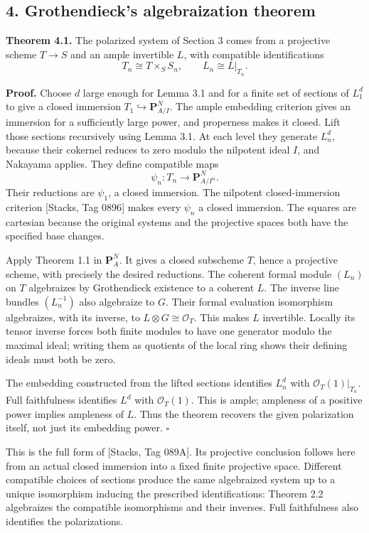 \documentclass[11pt]{article}
\begin{document}
\subsection{4. Grothendieck's algebraization
theorem}\label{grothendiecks-algebraization-theorem}

\textbf{Theorem 4.1.} The polarized system of Section 3 comes from a
projective scheme \(T\to S\) and an ample invertible \(L\), with
compatible identifications \[
T_n\cong T\times_S S_n,
\qquad L_n\cong L|_{T_n}.
\]

\textbf{Proof.} Choose \(d\) large enough for Lemma 3.1 and for a finite
set of sections of \(L_1^d\) to give a closed immersion
\(T_1\hookrightarrow\mathbf P^N_{A/I}\). The ample embedding criterion
gives an immersion for a sufficiently large power, and properness makes
it closed. Lift those sections recursively using Lemma 3.1. At each
level they generate \(L_n^d\), because their cokernel reduces to zero
modulo the nilpotent ideal \(I\), and Nakayama applies. They define
compatible maps \[
\psi_n:T_n\longrightarrow\mathbf P^N_{A/I^n}.
\] Their reductions are \(\psi_1\), a closed immersion. The nilpotent
closed-immersion criterion {[}Stacks, Tag 0896{]} makes every \(\psi_n\)
a closed immersion. The squares are cartesian because the original
systems and the projective spaces both have the specified base changes.

Apply Theorem 1.1 in \(\mathbf P^N_A\). It gives a closed subscheme
\(T\), hence a projective scheme, with precisely the desired reductions.
The coherent formal module \((L_n)\) on \(T\) algebraizes by
Grothendieck existence to a coherent \(L\). The inverse line bundles
\((L_n^{-1})\) also algebraize to \(G\). Their formal evaluation
isomorphism algebraizes, with its inverse, to
\(L\otimes G\cong\mathcal O_T\). This makes \(L\) invertible. Locally
its tensor inverse forces both finite modules to have one generator
modulo the maximal ideal; writing them as quotients of the local ring
shows their defining ideals must both be zero.

The embedding constructed from the lifted sections identifies \(L_n^d\)
with \(\mathcal O_T(1)|_{T_n}\). Full faithfulness identifies \(L^d\)
with \(\mathcal O_T(1)\). This is ample; ampleness of a positive power
implies ampleness of \(L\). Thus the theorem recovers the given
polarization itself, not just its embedding power. \(\square\)

This is the full form of {[}Stacks, Tag 089A{]}. Its projective
conclusion follows here from an actual closed immersion into a fixed
finite projective space. Different compatible choices of sections
produce the same algebraized system up to a unique isomorphism inducing
the prescribed identifications: Theorem 2.2 algebraizes the compatible
isomorphisms and their inverses. Full faithfulness also identifies the
polarizations.
\end{document}
